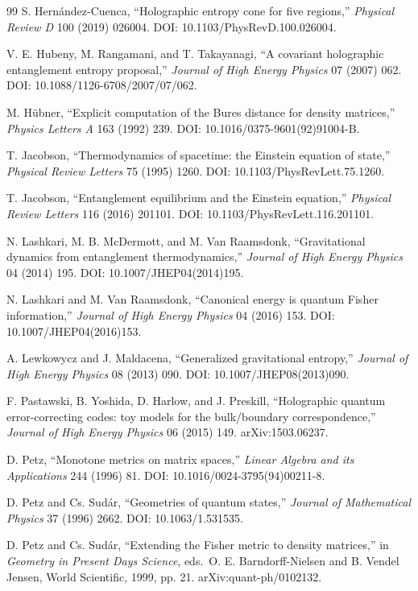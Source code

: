 \documentclass[11pt,letterpaper]{article}
\theoremstyle{definition}
\theoremstyle{remark}
\begin{document}
\begin{thebibliography}{99}
S. Hern\'andez-Cuenca,
``Holographic entropy cone for five regions,''
\emph{Physical Review D} 100 (2019) 026004.
DOI: 10.1103/PhysRevD.100.026004.

V. E. Hubeny, M. Rangamani, and T. Takayanagi,
``A covariant holographic entanglement entropy proposal,''
\emph{Journal of High Energy Physics} 07 (2007) 062.
DOI: 10.1088/1126-6708/2007/07/062.

M. H\"ubner,
``Explicit computation of the Bures distance for density matrices,''
\emph{Physics Letters A} 163 (1992) 239.
DOI: 10.1016/0375-9601(92)91004-B.

T. Jacobson,
``Thermodynamics of spacetime: the Einstein equation of state,''
\emph{Physical Review Letters} 75 (1995) 1260.
DOI: 10.1103/PhysRevLett.75.1260.

T. Jacobson,
``Entanglement equilibrium and the Einstein equation,''
\emph{Physical Review Letters} 116 (2016) 201101.
DOI: 10.1103/PhysRevLett.116.201101.

N. Lashkari, M. B. McDermott, and M. Van Raamsdonk,
``Gravitational dynamics from entanglement thermodynamics,''
\emph{Journal of High Energy Physics} 04 (2014) 195.
DOI: 10.1007/JHEP04(2014)195.

N. Lashkari and M. Van Raamsdonk,
``Canonical energy is quantum Fisher information,''
\emph{Journal of High Energy Physics} 04 (2016) 153.
DOI: 10.1007/JHEP04(2016)153.

A. Lewkowycz and J. Maldacena,
``Generalized gravitational entropy,''
\emph{Journal of High Energy Physics} 08 (2013) 090.
DOI: 10.1007/JHEP08(2013)090.

F. Pastawski, B. Yoshida, D. Harlow, and J. Preskill,
``Holographic quantum error-correcting codes: toy models for the bulk/boundary correspondence,''
\emph{Journal of High Energy Physics} 06 (2015) 149.
arXiv:1503.06237.

D. Petz,
``Monotone metrics on matrix spaces,''
\emph{Linear Algebra and its Applications} 244 (1996) 81.
DOI: 10.1016/0024-3795(94)00211-8.

D. Petz and Cs. Sud\'ar,
``Geometries of quantum states,''
\emph{Journal of Mathematical Physics} 37 (1996) 2662.
DOI: 10.1063/1.531535.

D. Petz and Cs. Sud\'ar,
``Extending the Fisher metric to density matrices,''
in \emph{Geometry in Present Days Science}, eds.\ O. E. Barndorff-Nielsen and B. Vendel Jensen, World Scientific, 1999, pp. 21.
arXiv:quant-ph/0102132.


\end{thebibliography}
\end{document}
